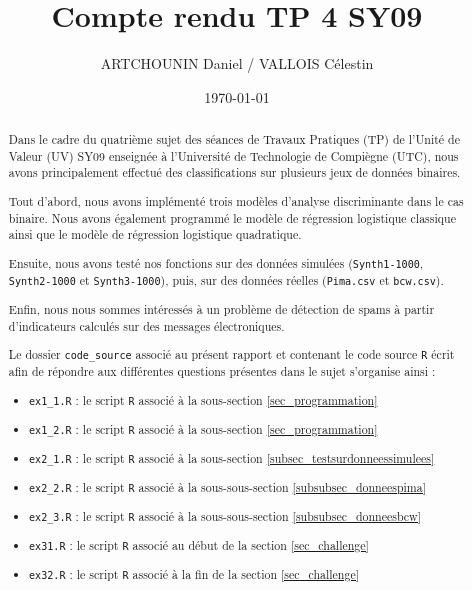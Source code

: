 \documentclass{article}
\title{Compte rendu TP 4 SY09}
\author{ARTCHOUNIN Daniel / VALLOIS Célestin}
\date{\today}
\begin{document}
\maketitle %

\thispagestyle{fancy} %



\begin{abstract}

Dans le cadre du quatrième sujet des séances de Travaux Pratiques (TP) de l'Unité de Valeur (UV) SY09 enseignée à l'Université de Technologie de Compiègne (UTC), nous avons principalement effectué des classifications sur plusieurs jeux de données binaires.

Tout d'abord, nous avons implémenté trois modèles d'analyse discriminante dans le cas binaire. Nous avons également programmé le modèle de régression logistique classique ainsi que le modèle de régression logistique quadratique.

Ensuite, nous avons testé nos fonctions sur des données simulées (\texttt{Synth1-1000},
\texttt{Synth2-1000} et \texttt{Synth3-1000}), puis, sur des données réelles (\texttt{Pima.csv} et  \texttt{bcw.csv}). 

Enfin, nous nous sommes intéressés à un problème de détection de spams à partir d'indicateurs calculés sur des messages électroniques. 

Le dossier \texttt{code\_source} associé au présent rapport et contenant le code source \texttt{R} écrit afin de répondre aux différentes questions présentes dans le sujet s'organise ainsi : 

\begin{itemize}
  \item \texttt{ex1\_1.R} : le script \texttt{R} associé à la sous-section \ref{sec_programmation}
  \item \texttt{ex1\_2.R} : le script \texttt{R} associé à la sous-section \ref{sec_programmation}
  \item \texttt{ex2\_1.R} :  le script \texttt{R} associé à la sous-section \ref{subsec_testsurdonneessimulees}
  \item \texttt{ex2\_2.R} : le script \texttt{R} associé à la sous-sous-section \ref{subsubsec_donneespima}
  \item \texttt{ex2\_3.R} :  le script \texttt{R} associé à la sous-sous-section \ref{subsubsec_donneesbcw}
  \item \texttt{ex31.R} : le script \texttt{R} associé au début de la section \ref{sec_challenge}
  \item \texttt{ex32.R} : le script \texttt{R} associé à la fin de la section \ref{sec_challenge}
\end{itemize}

\end{abstract}
\end{document}
